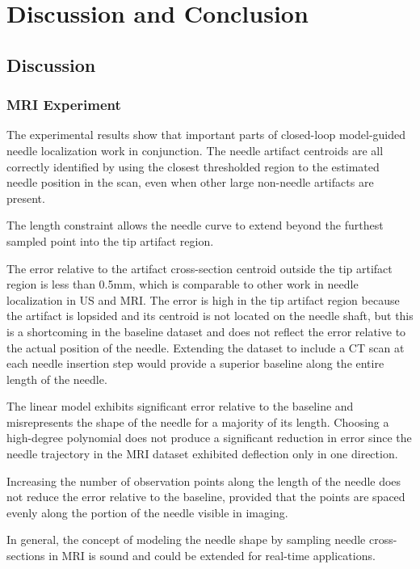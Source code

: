 \chapter{Discussion and Conclusion}
\label{sec:conclusions} %

\section{Discussion}
\subsection{MRI Experiment}
The experimental results show that important parts of closed-loop model-guided needle localization work in conjunction. The needle artifact centroids are all correctly identified by using the closest thresholded region to the estimated needle position in the scan, even when other large non-needle artifacts are present.

The length constraint allows the needle curve to extend beyond the furthest sampled point into the tip artifact region.

The error relative to the artifact cross-section centroid outside the tip artifact region is less than 0.5mm, which is comparable to other work in needle localization in US\cite{rossa_adaptive_2016} and MRI\cite{song_biopsy_2012}. The error is high in the tip artifact region because the artifact is lopsided and its centroid is not located on the needle shaft, but this is a shortcoming in the baseline dataset and does not reflect the error relative to the actual position of the needle. Extending the dataset to include a CT scan at each needle insertion step would provide a superior baseline along the entire length of the needle.

The linear model exhibits significant error relative to the baseline and misrepresents the shape of the needle for a majority of its length. Choosing a high-degree polynomial does not produce a significant reduction in error since the needle trajectory in the MRI dataset exhibited deflection only in one direction.

Increasing the number of observation points along the length of the needle does not reduce the error relative to the baseline, provided that the points are spaced evenly along the portion of the needle visible in imaging.

In general, the concept of modeling the needle shape by sampling needle cross-sections in MRI is sound and could be extended for real-time applications.


